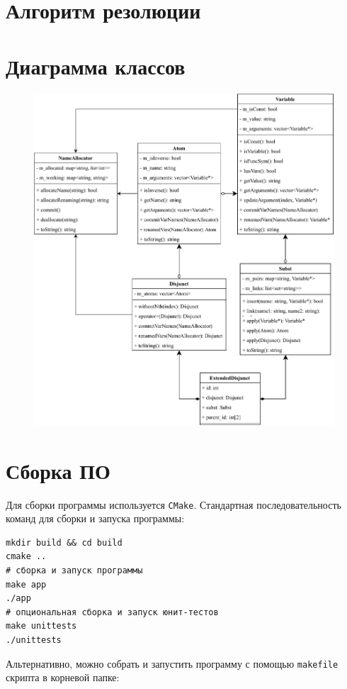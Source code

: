 \section{Алгоритм резолюции}



\section{Диаграмма классов}

\begin{figure}[h!]
    \includegraphics[width=0.8\linewidth]{uml.pdf}
\end{figure}

\section{Сборка ПО}

Для сборки программы используется \texttt{CMake}. Стандартная последовательность команд для сборки и запуска программы:

\begin{verbatim}
mkdir build && cd build
cmake ..
# сборка и запуск программы
make app
./app
# опциональная сборка и запуск юнит-тестов
make unittests
./unittests
\end{verbatim}

Альтернативно, можно собрать и запустить программу с помощью \texttt{makefile} скрипта в корневой папке:

